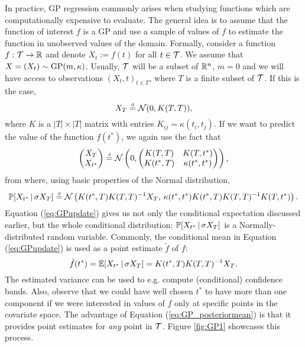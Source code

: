 In practice, GP regression commonly arises when studying functions which are computationally expensive to evaluate. The general idea is to assume that the function of interest $f$ is a GP and use a sample of values of $f$ to estimate the function in unobserved values of the domain. Formally, consider a function $f: \mathcal{T} \to \mathbb{R}$ and denote $X_t := f(t)$ for all $t \in \mathcal{T}$. We assume that $X = (X_t) \sim \mathrm{GP} (m, \kappa)$. Usually, $\mathcal{T}$ will be a subset of $\mathbb{R}^n$, $m = 0$ and we will have access to observations $(X_t, t)_{t \in T}$, where $T$ is a finite subset of $\mathcal{T}$. If this is the case,
\begin{equation} \label{eq:GP_noise_free}
	X_T \stackrel{\text{\rm\tiny d}}{=} \mathcal{N} (0, K(T, T)),
\end{equation}
where $K$ is a $|T| \times |T|$ matrix with entries $K_{ij} = \kappa(t_i, t_j)$. If we want to predict the value of the function $f(t^{*})$, we again use the fact that
\begin{equation*}
	\begin{pmatrix} X_T \\ X_{t^{*}} \end{pmatrix} \stackrel{\text{\rm\tiny d}}{=} \mathcal{N} \left( 0, \begin{pmatrix} K(T, T) & K(T, t^{*}) \\ K(t^{*}, T) & \kappa(t^{*}, t^{*}) \end{pmatrix} \right),
\end{equation*}
from where, using basic properties of the Normal distribution,
\begin{equation} \label{eq:GPupdate}
	\mathbb{P} [X_{t^{*}} \,| \, \sigma X_T ] \stackrel{\text{\rm\tiny d}}{=} \mathcal{N} \left( K(t^{*}, T) K(T, T)^{-1} X_T, \, \kappa(t^{*}, t^{*}) K(t^{*}, T) K(T, T)^{-1} K(T, t^{*})  \right).
\end{equation}
Equation (\ref{eq:GPupdate}) gives us not only the conditional expectation discussed earlier, but the whole conditional distribution: $\mathbb{P} [X_{t^{*}} \,| \, \sigma X_T ]$ is a Normally-distributed random variable. Commonly, the conditional mean in Equation (\ref{eq:GPupdate}) is used as a point estimate $\tilde{f}$ of $f$:
\begin{equation} \label{eq:GP_posteriormean}
	\tilde{f} (t^{*}) = \mathbb{E} [ X_{t^{*}} \, | \, \sigma X_T ] = K(t^{*}, T) K(T, T)^{-1} X_T.
\end{equation}
The estimated variance can be used to e.g. compute (conditional) confidence bands. Also, observe that we could have well chosen $t^{*}$ to have more than one component if we were interested in values of $f$ only at specific points in the covariate space. The advantage of Equation (\ref{eq:GP_posteriormean}) is that it provides point estimates for \textit{any} point in $\mathcal{T}$. Figure \ref{fig:GP1} showcases this process. \\




